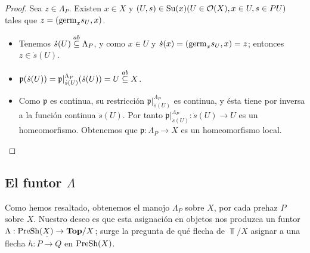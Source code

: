 \begin{proof}
   Sea $z\in\Lambda_P$. Existen $x\in X$ y $(U,s)\in\normalfont{\text{Su}}(x) (U\in\mathcal{O}(X),x\in U,s\in PU)$ tales que $z=(\normalfont{\text{germ}}_{x}s_{U},x)$.
   \begin{itemize}
      \item Tenemos $\dot{s}(U)\stackrel{ab}{\subseteq} \Lambda_P$, y como $x\in U$ y $\dot{s}(x)=(\normalfont{\text{germ}}_{x}s_{U},x)=z$; entonces $z\in\dot{s}(U)$.
      \item $\mathfrak{p}(\dot{s}(U))=\mathfrak{p}|^{\Lambda_P}_{\dot{s}(U)}(\dot{s}(U))=U\stackrel{ab}{\subseteq} X$.
      \item Como $\mathfrak{p}$ es continua, su restricción $\mathfrak{p}|^{\Lambda_P}_{\dot{s}(U)}$ es continua, y ésta tiene por inversa a la función continua $\dot{s}(U)$. Por tanto $\mathfrak{p}|^{\Lambda_P}_{\dot{s}(U)}:\dot{s}(U)\to U$ es un homeomorfismo.
      Obtenemos que $\mathfrak{p}:\Lambda_P\to X$ es un homeomorfismo local.
   \end{itemize}
\end{proof}

\subsection{El funtor $\Lambda$}
Como hemos resaltado, obtenemos el manojo $\Lambda_P$ sobre $X$, por cada prehaz $P$ sobre $X$. Nuestro deseo es que esta asignación en objetos nos produzca un funtor $\Lambda:\normalfont{\text{PreSh}}(X)\to\normalfont{\textbf{Top}}/X$; surge la pregunta de qué flecha de $\Top/X$ asignar a una flecha $h:P\dot{\to} Q$ en $\normalfont{\text{PreSh}}(X)$.

